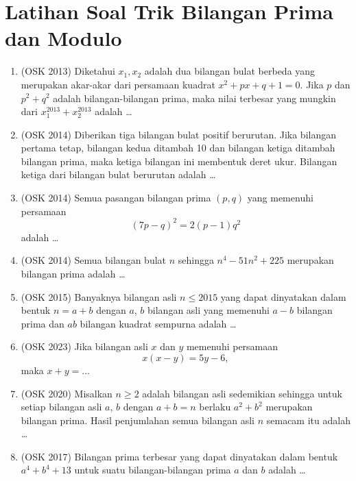 \documentclass[12pt]{scrartcl}
\begin{document}
\section{Latihan Soal Trik Bilangan Prima dan Modulo}
\begin{enumerate}
        \item (OSK 2013) Diketahui $x_1,x_2$ adalah dua bilangan bulat berbeda yang merupakan akar-akar dari persamaan kuadrat $x^2+px+q+1=0$. Jika $p$ dan $p^2+q^2$ adalah bilangan-bilangan prima, maka nilai terbesar yang mungkin dari $x_1^{2013}+x_2^{2013}$ adalah \dots
        
        \item (OSK 2014) Diberikan tiga bilangan bulat positif berurutan. Jika bilangan pertama tetap, bilangan kedua ditambah 10 dan bilangan ketiga ditambah bilangan prima, maka ketiga bilangan ini membentuk deret ukur. Bilangan ketiga dari bilangan bulat berurutan adalah \dots
        
        \item (OSK 2014) Semua pasangan bilangan prima $(p,q)$ yang memenuhi persamaan
        $$(7p-q)^2=2(p-1)q^2$$
        adalah \dots
        
        \item (OSK 2014) Semua bilangan bulat $n$ sehingga $n^4-51n^2+225$ merupakan bilangan prima adalah \dots

        \item (OSK 2015) Banyaknya bilangan asli $n \leq 2015$ yang dapat dinyatakan dalam bentuk $n = a + b$ dengan $a$, $b$ bilangan asli yang memenuhi $a - b$ bilangan prima dan $ab$ bilangan kuadrat sempurna adalah \ldots

        
        \item (OSK 2023) Jika bilangan asli $x$ dan $y$ memenuhi persamaan
        $$x(x-y)=5y-6,$$
        maka $x+y=\ldots$

        \item (OSK 2020) Misalkan $n \geq 2$ adalah bilangan asli sedemikian sehingga untuk setiap bilangan asli $a$, $b$ dengan $a + b = n$ berlaku $a^2 + b^2$ merupakan bilangan prima. Hasil penjumlahan semua bilangan asli $n$ semacam itu adalah \ldots

        \item (OSK 2017) Bilangan prima terbesar yang dapat dinyatakan dalam bentuk $a^4+b^4+13$ untuk suatu bilangan-bilangan prima $a$ dan $b$ adalah \ldots
\end{enumerate}
\end{document}
